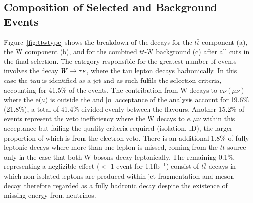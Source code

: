 \subsection{Composition of Selected \ttj and \wj Background Events}
\label{sec:ttwcomp}
Figure~\ref{fig:ttwtype} shows the breakdown of the decays for the $t\bar{t}$ component (a), the W component (b), and for the combined $t\bar{t}$-W background (c) after all cuts in the final selection. The category responsible for the greatest number of events involves the decay $W \rightarrow \tau \nu$, where the tau lepton decays hadronically. In this case the tau is identified as a jet and as such fulfils the selection criteria, accounting for 41.5\% of the events. The contribution from W decays to $e \nu(\mu \nu)$ where the e($\mu$) is outside the \Pt and $|\eta|$ acceptance of the analysis account for 19.6\%(21.8\%), a total of 41.4\% divided evenly between the flavours. Another 15.2\% of events represent the veto inefficiency where the W decays to $e, \mu \nu$ within this acceptance but failing the quality criteria required (isolation, ID), the larger proportion of which is from the electron veto. There is an additional 1.8\% of fully leptonic decays where more than one lepton is missed, coming from the $t\bar{t}$ source only in the case that both W bosons decay leptonically. The remaining 0.1\%, representing a negligible effect ($<$ 1 event for 1.1fb$^{-1}$) consist of $t\bar{t}$ decays in which non-isolated leptons are produced within jet fragmentation and meson decay, therefore regarded as a fully hadronic decay despite the existence of missing energy from neutrinos.

